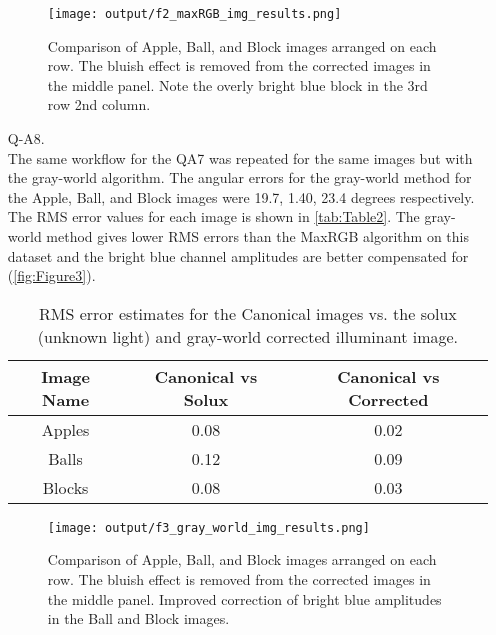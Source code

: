 \documentclass[12pt]{report}
\begin{document}
\begin{enumerate}
    \begin{figure}[H]
        \centering
        \texttt{[image: output/f2\_maxRGB\_img\_results.png]}
        \caption{Comparison of Apple, Ball, and Block images arranged on each row. The bluish effect is removed from the corrected images in the middle panel. 
        Note the overly bright blue block in the 3rd row 2nd column.}
        \label{fig:Figure2}
    \end{figure}

    \FloatBarrier 

    \item[Q-A8.]
    \ \\
    The same workflow for the QA7 was repeated for the same images but with the gray-world algorithm. The angular errors for the gray-world method for the Apple, Ball, 
    and Block images were 19.7, 1.40, 23.4 degrees respectively. The RMS error values for each image is shown in \autoref{tab:Table2}. The gray-world method gives 
    lower RMS errors than the MaxRGB algorithm on this dataset and the bright blue channel amplitudes are better compensated for (\autoref{fig:Figure3}).

    \begin{table}[h!]
    \begin{center}
    \begin{tabular}{ | c | c | c | } 
        \hline
        Image Name & Canonical vs Solux & Canonical vs Corrected \\ 
        \hline \hline
        Apples & 0.08 & 0.02 \\ 
        Balls  & 0.12 & 0.09 \\ 
        Blocks & 0.08 & 0.03 \\
        \hline
    \end{tabular}
    \caption{RMS error estimates for the Canonical images vs. the solux (unknown light) and gray-world corrected illuminant image.}
    \label{tab:Table2}
    \end{center}
    \end{table}

    \begin{figure}[H]
        \centering
        \texttt{[image: output/f3\_gray\_world\_img\_results.png]}
        \caption{Comparison of Apple, Ball, and Block images arranged on each row. The bluish effect is removed from the corrected images in the middle panel. 
        Improved correction of bright blue amplitudes in the Ball and Block images.}
        \label{fig:Figure3}
    \end{figure}


\end{enumerate}
\end{document}
